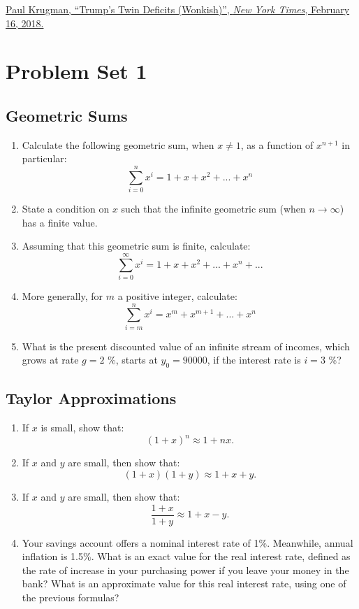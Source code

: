 \documentclass[]{book}
\theoremstyle{definition}
\theoremstyle{definition}
\theoremstyle{definition}
\theoremstyle{remark}
\begin{document}
\href{https://search.proquest.com/nytimes/docview/2002526277/AF5280E4BCB54A41PQ/}{Paul
Krugman, ``Trump's Twin Deficits (Wonkish)'', \emph{New York Times},
February 16, 2018.}

\appendix


\hypertarget{pset1}{\chapter{Problem Set 1}\label{pset1}}

\section{Geometric Sums}\label{geometric-sums}

\begin{enumerate}
\def\labelenumi{\arabic{enumi}.}
\item
  Calculate the following geometric sum, when \(x \neq 1\), as a
  function of \(x^{n+1}\) in particular:
  \[\sum_{i=0}^n x^i = 1+x+x^2+...+x^n\]
\item
  State a condition on \(x\) such that the infinite geometric sum (when
  \(n \to \infty\)) has a finite value.
\item
  Assuming that this geometric sum is finite, calculate:
  \[\sum_{i=0}^{\infty} x^i = 1+x+x^2+...+x^n+...\]
\item
  More generally, for \(m\) a positive integer, calculate:
  \[\sum_{i=m}^n x^i = x^m+x^{m+1}+...+x^n\]
\item
  What is the present discounted value of an infinite stream of incomes,
  which grows at rate \(g=2\) \%, starts at \(y_0=90000\), if the
  interest rate is \(i=3\) \%?
\end{enumerate}

\section{Taylor Approximations}\label{taylor-approximations}

\begin{enumerate}
\def\labelenumi{\arabic{enumi}.}
\item
  If \(x\) is small, show that: \[(1+x)^n \approx 1+nx.\]
\item
  If \(x\) and \(y\) are small, then show that:
  \[(1+x)(1+y) \approx 1+x+y.\]
\item
  If \(x\) and \(y\) are small, then show that:
  \[\frac{1+x}{1+y} \approx 1+x-y.\]
\item
  Your savings account offers a nominal interest rate of 1\%. Meanwhile,
  annual inflation is 1.5\%. What is an exact value for the real
  interest rate, defined as the rate of increase in your purchasing
  power if you leave your money in the bank? What is an approximate
  value for this real interest rate, using one of the previous formulas?
\end{enumerate}
\end{document}
